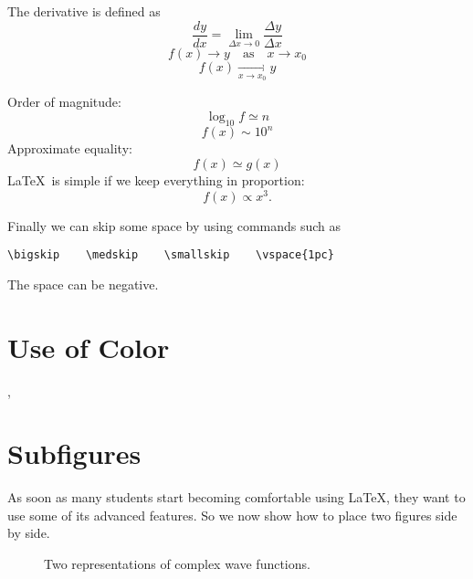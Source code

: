 \documentclass[12pt]{article}
\begin{document}
The derivative is defined as
\begin{equation}
  \frac{dy}{dx} = \lim_{\Delta x \to 0} \frac{\Delta y}
  {\Delta x}
\end{equation}
\begin{equation}
  f(x) \to y \quad \mbox{as} \quad x \to
  x_{0}
\end{equation}
\begin{equation}
  f(x) \mathop {\longrightarrow}
  \limits_{x \to x_0} y
\end{equation}

\noindent Order of magnitude:
\begin{equation}
  \log_{10}f \simeq n
\end{equation}
\begin{equation}
  f(x)\sim 10^{n}
\end{equation}
Approximate equality:
\begin{equation}
  f(x)\simeq g(x)
\end{equation}
\LaTeX\ is simple if we keep everything in proportion:
\begin{equation}
  f(x) \propto x^3 .
\end{equation}

Finally we can skip some space by using commands such as
\begin{verbatim}
\bigskip    \medskip    \smallskip    \vspace{1pc}
\end{verbatim}
The space can be negative.

\section{\color{red}Use of Color}

{\color{blue}{We can change colors for emphasis}},
{\color{green}{but}} {\color{cyan}{who is going pay for the ink?}}

\section{\label{morefig}Subfigures}

As soon as many students start becoming comfortable using \LaTeX, they want
to use some of its advanced features. So we now show how to place two
figures side by side.

\begin{figure}[h!]
  \begin{center}
    \caption{\label{fig:qm/complexfunctions} Two representations of complex
    wave functions.}
  \end{center}
\end{figure}
\end{document}
